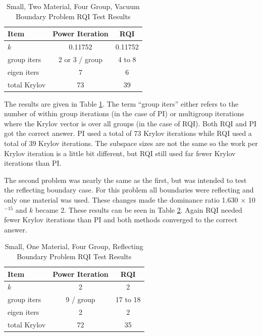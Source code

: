 \begin{table}[!h]
\caption{Small, Two Material, Four Group, Vacuum Boundary Problem RQI Test Results}
\begin{center}
\begin{tabular}{l c c}
\hline
Item & Power Iteration & RQI \\[0.5ex]
\hline
$k$ & 0.11752 & 0.11752 \\
group iters & 2 or 3 / group   & 4 to 8 \\
eigen iters & 7 & 6 \\
total Krylov & 73 & 39 \\
\hline
\end{tabular}
\end{center}
\label{table:SmallVacuumRQI}
\end{table}
%
The results are given in Table \ref{table:SmallVacuumRQI}. The term ``group iters'' either refers to the number of within group iterations (in the case of PI) or multigroup iterations where the Krylov vector is over all groups (in the case of RQI). Both RQI and PI got the correct answer. PI used a total of 73 Krylov iterations while RQI used a total of 39 Krylov iterations. The subspace sizes are not the same so the work per Krylov iteration is a little bit different, but RQI still used far fewer Krylov iterations than PI. 

The second problem was nearly the same as the first, but was intended to test the reflecting boundary case. For this problem all boundaries were reflecting and only one material was used. These changes made the dominance ratio 1.630 $\times$ 10$^{-15}$ and $k$ became 2. These results can be seen in Table \ref{table:SmallReflectingRQI}. Again RQI needed fewer Krylov iterations than PI and both methods converged to the correct answer. 
%
\begin{table}[!h]
\caption{Small, One Material, Four Group, Reflecting Boundary Problem RQI Test Results}
\begin{center}
\begin{tabular}{l c c}
\hline
Item & Power Iteration & RQI \\[0.5ex]
\hline
$k$ & 2 & 2 \\
group iters & 9 / group   & 17 to 18 \\
eigen iters & 2 & 2 \\
total Krylov & 72 & 35 \\
\hline
\end{tabular}
\end{center}
\label{table:SmallReflectingRQI}
\end{table}

